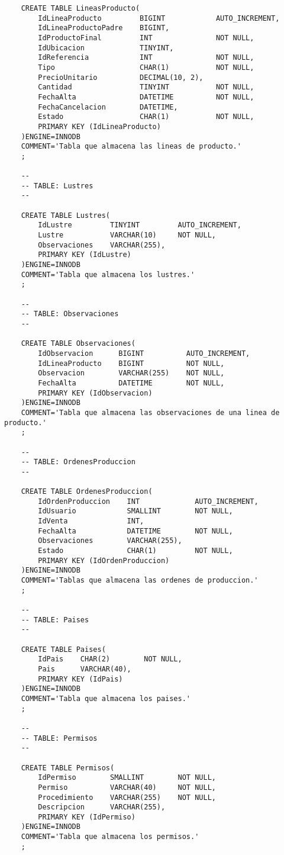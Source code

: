 \begin{lstlisting}
	CREATE TABLE LineasProducto(
		IdLineaProducto         BIGINT            AUTO_INCREMENT,
		IdLineaProductoPadre    BIGINT,
		IdProductoFinal         INT               NOT NULL,
		IdUbicacion             TINYINT,
		IdReferencia            INT               NOT NULL,
		Tipo                    CHAR(1)           NOT NULL,
		PrecioUnitario          DECIMAL(10, 2),
		Cantidad                TINYINT           NOT NULL,
		FechaAlta               DATETIME          NOT NULL,
		FechaCancelacion        DATETIME,
		Estado                  CHAR(1)           NOT NULL,
		PRIMARY KEY (IdLineaProducto)
	)ENGINE=INNODB
	COMMENT='Tabla que almacena las lineas de producto.'
	;

	-- 
	-- TABLE: Lustres 
	--

	CREATE TABLE Lustres(
		IdLustre         TINYINT         AUTO_INCREMENT,
		Lustre           VARCHAR(10)     NOT NULL,
		Observaciones    VARCHAR(255),
		PRIMARY KEY (IdLustre)
	)ENGINE=INNODB
	COMMENT='Tabla que almacena los lustres.'
	;

	-- 
	-- TABLE: Observaciones 
	--

	CREATE TABLE Observaciones(
		IdObservacion      BIGINT          AUTO_INCREMENT,
		IdLineaProducto    BIGINT          NOT NULL,
		Observacion        VARCHAR(255)    NOT NULL,
		FechaAlta          DATETIME        NOT NULL,
		PRIMARY KEY (IdObservacion)
	)ENGINE=INNODB
	COMMENT='Tabla que almacena las observaciones de una linea de producto.'
	;

	-- 
	-- TABLE: OrdenesProduccion 
	--

	CREATE TABLE OrdenesProduccion(
		IdOrdenProduccion    INT             AUTO_INCREMENT,
		IdUsuario            SMALLINT        NOT NULL,
		IdVenta              INT,
		FechaAlta            DATETIME        NOT NULL,
		Observaciones        VARCHAR(255),
		Estado               CHAR(1)         NOT NULL,
		PRIMARY KEY (IdOrdenProduccion)
	)ENGINE=INNODB
	COMMENT='Tablas que almacena las ordenes de produccion.'
	;

	-- 
	-- TABLE: Paises 
	--

	CREATE TABLE Paises(
		IdPais    CHAR(2)        NOT NULL,
		Pais      VARCHAR(40),
		PRIMARY KEY (IdPais)
	)ENGINE=INNODB
	COMMENT='Tabla que almacena los paises.'
	;

	-- 
	-- TABLE: Permisos 
	--

	CREATE TABLE Permisos(
		IdPermiso        SMALLINT        NOT NULL,
		Permiso          VARCHAR(40)     NOT NULL,
		Procedimiento    VARCHAR(255)    NOT NULL,
		Descripcion      VARCHAR(255),
		PRIMARY KEY (IdPermiso)
	)ENGINE=INNODB
	COMMENT='Tabla que almacena los permisos.'
	;


\end{lstlisting}
